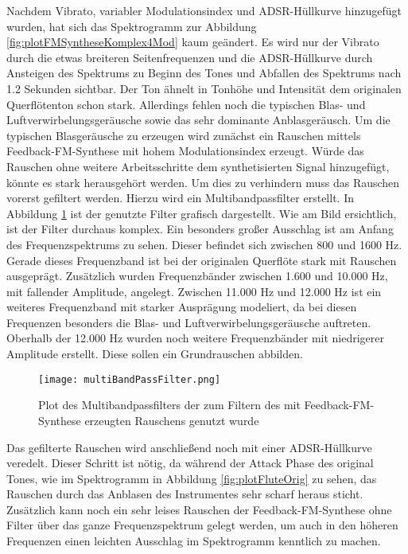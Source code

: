 Nachdem Vibrato, variabler Modulationsindex und ADSR-Hüllkurve hinzugefügt wurden, hat sich das Spektrogramm zur Abbildung \ref{fig:plotFMSyntheseKomplex4Mod} kaum geändert. Es wird nur der Vibrato durch die etwas breiteren Seitenfrequenzen und die ADSR-Hüllkurve durch Ansteigen des Spektrums zu Beginn des Tones und Abfallen des Spektrums nach 1.2 Sekunden sichtbar. Der Ton ähnelt in Tonhöhe und Intensität dem originalen Querflötenton schon stark. Allerdings fehlen noch die typischen Blas- und Luftverwirbelungsgeräusche sowie das sehr dominante Anblasgeräusch. Um die typischen Blasgeräusche zu erzeugen wird zunächst ein Rauschen mittels Feedback-FM-Synthese mit hohem Modulationsindex erzeugt. Würde das Rauschen ohne weitere Arbeitsschritte dem synthetisierten Signal hinzugefügt, könnte es stark herausgehört werden. Um dies zu verhindern muss das Rauschen vorerst gefiltert werden. Hierzu wird ein Multibandpassfilter erstellt. In Abbildung \ref{fig:multiBandPassFilter} ist der genutzte Filter grafisch dargestellt. Wie am Bild ersichtlich, ist der Filter durchaus komplex. Ein besonders großer Ausschlag ist am Anfang des Frequenzspektrums zu sehen. Dieser befindet sich zwischen 800 und 1600 Hz. Gerade dieses Frequenzband ist bei der originalen Querflöte stark mit Rauschen ausgeprägt. Zusätzlich wurden Frequenzbänder zwischen 1.600 und 10.000 Hz, mit fallender Amplitude, angelegt. Zwischen 11.000 Hz und 12.000 Hz ist ein weiteres Frequenzband mit starker Ausprägung modeliert, da bei diesen Frequenzen besonders die Blas- und Luftverwirbelungsgeräusche auftreten. Oberhalb der 12.000 Hz wurden noch weitere Frequenzbänder mit niedrigerer Amplitude erstellt. Diese sollen ein Grundrauschen abbilden.

\begin{figure} [h!t!b!]
\centering
  \texttt{[image: multiBandPassFilter.png]}
\caption{Plot des Multibandpassfilters der zum Filtern des mit Feedback-FM-Synthese erzeugten Rauschens genutzt wurde}
\label{fig:multiBandPassFilter}
\end{figure}

Das gefilterte Rauschen wird anschließend noch mit einer ADSR-Hüllkurve veredelt. Dieser Schritt ist nötig, da während der Attack Phase des original Tones, wie im Spektrogramm in Abbildung \ref{fig:plotFluteOrig} zu sehen, das Rauschen durch das Anblasen des Instrumentes sehr scharf heraus sticht. Zusätzlich kann noch ein sehr leises Rauschen der Feedback-FM-Synthese ohne Filter über das ganze Frequenzspektrum gelegt werden, um auch in den höheren Frequenzen einen leichten Ausschlag im Spektrogramm kenntlich zu machen. 

